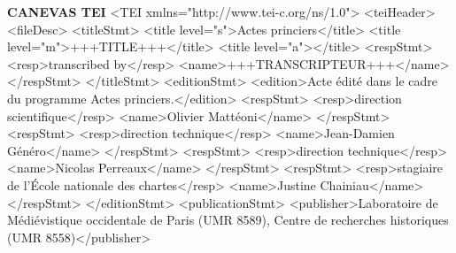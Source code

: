 \textbf{CANEVAS TEI} \newline 
<TEI xmlns="http://www.tei-c.org/ns/1.0"> \newline 
<teiHeader> \newline 
<fileDesc> \newline 
<titleStmt> \newline 
<title level="s">Actes princiers</title> \newline 
<title level="m">+++TITLE+++</title> \newline 
<title level="a"></title> \newline 
<respStmt> \newline 
<resp>transcribed by</resp> \newline 
<name>+++TRANSCRIPTEUR+++</name> \newline 
</respStmt> \newline 
</titleStmt> \newline 
<editionStmt> \newline 
<edition>Acte édité dans le cadre du programme Actes princiers.</edition> \newline 
<respStmt> \newline 
<resp>direction scientifique</resp> \newline 
<name>Olivier Mattéoni</name> \newline 
</respStmt> \newline 
<respStmt> \newline 
<resp>direction technique</resp> \newline 
<name>Jean-Damien Généro</name> \newline 
</respStmt> \newline 
<respStmt> \newline 
<resp>direction technique</resp> \newline 
<name>Nicolas Perreaux</name> \newline 
</respStmt> \newline 
<respStmt> \newline 
<resp>stagiaire de l'École nationale des chartes</resp> \newline 
<name>Justine Chainiau</name> \newline 
</respStmt> \newline 
</editionStmt> \newline 
<publicationStmt> \newline 
<publisher>Laboratoire de Médiévistique occidentale de Paris (UMR 8589), Centre de recherches historiques (UMR 8558)</publisher> \newline 
